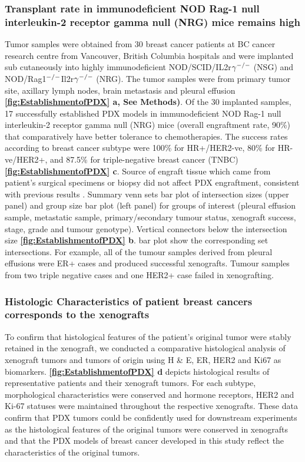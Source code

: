 \subsubsection{Transplant rate in immunodeficient NOD Rag-1 null interleukin-2 receptor gamma null (NRG) mice  remains high}
Tumor samples were obtained from 30 breast cancer patients at BC cancer research centre from Vancouver, British Columbia hospitals and were implanted sub cutaneously into highly immunodeficient NOD/SCID/IL2r$\gamma^{\small{-/-}}$ (NSG) and NOD/Rag1$^{\small{-/-}}$Il2r$\gamma ^{\small{-/-}}$ (NRG)\cite{pearson2008non}. The tumor samples were from primary tumor site, axillary lymph nodes, brain metastasis and pleural effusion \textbf{\autoref{fig:EstablishmentofPDX} a, See Methods)}.
Of the 30 implanted samples, 17 successfully established PDX models in immunodeficient NOD Rag-1 null interleukin-2 receptor gamma null (NRG) mice (overall engraftment rate, 90\%) that comparatively have better tolerance to chemotherapies. The success rates according to breast cancer subtype were 100\% for HR+/HER2-ve, 80\% for HR-ve/HER2+, and 87.5\% for triple-negative breast cancer (TNBC) \textbf{\autoref{fig:EstablishmentofPDX} c}. Source of engraft tissue which came from patient's surgical specimens or biopsy did not affect PDX engraftment, consistent with previous results \cite{ryu2019integrative}. Summary venn sets bar plot of intersection sizes (upper panel) and group size bar plot (left panel) for groups of interest (pleural effusion sample, metastatic sample, primary/secondary tumour status, xenograft success, stage, grade and tumour genotype). Vertical connectors below the intersection size \textbf{\autoref{fig:EstablishmentofPDX} b}.
bar plot show the corresponding set intersections. For example, all of the tumour samples derived from pleural effusions were ER+ cases and produced successful xenografts. Tumour samples from two triple negative cases and one HER2+ case failed in xenografting.


\subsubsection{Histologic Characteristics of patient breast cancers corresponds to the xenografts}

To confirm that histological features of the patient's original tumor were stably retained in the xenograft, we conducted a comparative histological analysis of xenograft tumors and tumors of origin using H \& E, ER, HER2 and Ki67 as biomarkers. 
\textbf{\autoref{fig:EstablishmentofPDX} d} depicts histological results of representative patients and their xenograft tumors. For each subtype, morphological characteristics were conserved and hormone receptors, HER2 and Ki-67 statuses were maintained throughout the respective xenografts. These data confirm that PDX tumors could be confidently used for downstream experiments as the histological features of the original tumors were conserved in xenografts and that the PDX models of breast cancer developed in this study reflect the characteristics of the original tumors.

